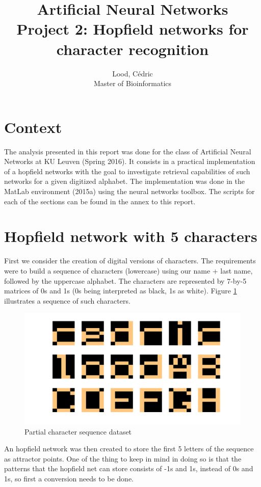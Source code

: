 \documentclass[11pt, a4paper]{article}
\title{ \huge Artificial Neural Networks \\ 
  { \large Project 2: Hopfield networks for character recognition}}
\author{
        Lood, Cédric \\
        \small Master of Bioinformatics
}
\begin{document}
\maketitle

\section{Context}
The analysis presented in this report was done for the class of
Artificial Neural Networks at KU Leuven (Spring 2016). It consists in
a practical implementation of a hopfield networks with the goal to
investigate retrieval capabilities of such networks for a given
digitized alphabet. The implementation was done in the MatLab
environment (2015a) using the neural networks toolbox. The scripts for
each of the sections can be found in the annex to this report.

\section{Hopfield network with 5 characters}

First we consider the creation of digital versions of characters. The
requirements were to build a sequence of characters (lowercase) using
our name + last name, followed by the uppercase alphabet. The
characters are represented by 7-by-5 matrices of 0s and 1s (0s being
interpreted as black, 1s as white). Figure \ref{fig:hopfield_chargen}
illustrates a sequence of such characters.

\begin{figure}[H]
  \centering
  \includegraphics[scale=.30]{hopfield_chargen.png}
  \caption{Partial character sequence dataset}
  \label{fig:hopfield_chargen}
\end{figure}

An hopfield network was then created to store the first 5 letters of
the sequence as attractor points. One of the thing to keep in mind in
doing so is that the patterns that the hopfield net can store consists
of -1s and 1s, instead of 0s and 1s, so first a conversion needs to be
done. 
\end{document}
